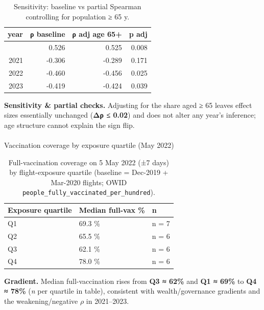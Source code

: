 \documentclass[
  authoryear,
  preprint,
  3p,
  onecolumn]{elsarticle}
\makeatletter
\let\oldparagraph\paragraph
\renewcommand{\paragraph}{
    \@ifstar
      \xxxParagraphStar
      \xxxParagraphNoStar
  }
\newcommand{\xxxParagraphStar}[1]{\oldparagraph*{#1}\mbox{}}
\newcommand{\xxxParagraphNoStar}[1]{\oldparagraph{#1}\mbox{}}
\makeatother
\begin{document}
\begin{longtable}[]{@{}rrrr@{}}

\caption{\label{tbl-sensitivity}Sensitivity: baseline vs partial
Spearman controlling for population ≥ 65 y.}

\tabularnewline

\toprule\noalign{}
year & ρ baseline & ρ adj age 65+ & p adj \\
\midrule\noalign{}
\endhead
\bottomrule\noalign{}
\endlastfoot
2020 & 0.526 & 0.525 & 0.008 \\
2021 & -0.306 & -0.289 & 0.171 \\
2022 & -0.460 & -0.456 & 0.025 \\
2023 & -0.419 & -0.424 & 0.039 \\

\end{longtable}

\textbf{Sensitivity \& partial checks.} Adjusting for the share aged ≥
65 leaves effect sizes essentially unchanged
(\textbf{\textbar Δρ\textbar{} ≤ 0.02}) and does not alter any year's
inference; age structure cannot explain the sign flip.

\paragraph{Vaccination coverage by exposure quartile (May
2022)}\label{vaccination-coverage-by-exposure-quartile-may-2022}

\begin{longtable}[]{@{}lll@{}}

\caption{\label{tbl-vaccination_exposure_res}Full-vaccination coverage
on 5 May 2022 (±7 days) by flight-exposure quartile (baseline = Dec-2019
+ Mar-2020 flights; OWID
\texttt{people\_fully\_vaccinated\_per\_hundred}).}

\tabularnewline

\toprule\noalign{}
Exposure quartile & Median full-vax \% & n \\
\midrule\noalign{}
\endhead
\bottomrule\noalign{}
\endlastfoot
Q1 & 69.3 \% & n = 7 \\
Q2 & 65.5 \% & n = 6 \\
Q3 & 62.1 \% & n = 6 \\
Q4 & 78.0 \% & n = 6 \\

\end{longtable}

\textbf{Gradient.} Median full-vaccination rises from \textbf{Q3 ≈ 62\%}
and \textbf{Q1 ≈ 69\%} to \textbf{Q4 ≈ 78\%} (\emph{n} per quartile in
table), consistent with wealth/governance gradients and the
weakening/negative \(\rho\) in 2021--2023.
\end{document}
